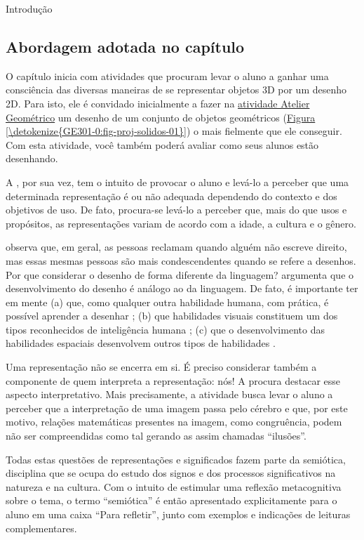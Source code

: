 \begin{apresentacao}{Introdução}
\subsection{Abordagem adotada no capítulo}

O capítulo inicia com atividades que procuram levar o aluno a ganhar uma consciência das diversas maneiras de se representar objetos 3D por um desenho 2D. Para isto, ele é convidado inicialmente a fazer na \hyperref[\detokenize{GE301-0:ativ-proj-atelier-geometrico}]{atividade Atelier Geométrico} um desenho de um conjunto de objetos geométricos (\hyperref[\detokenize{GE301-0:fig-proj-solidos-01}]{Figura \ref{\detokenize{GE301-0:fig-proj-solidos-01}}}) o mais fielmente que ele conseguir. Com esta atividade, você também poderá avaliar como seus alunos estão desenhando.

A , por sua vez, tem o intuito de provocar o aluno e levá-lo a perceber que uma determinada representação é ou não adequada dependendo do contexto e dos objetivos de uso. De fato, procura-se levá-lo a perceber que, mais do que usos e propósitos, as representações variam de acordo com a idade, a cultura e o gênero.

\citet{Cohn-2012} observa que, em geral, as pessoas reclamam quando alguém não escreve direito, mas essas mesmas pessoas são mais condescendentes quando se refere a desenhos. Por que considerar o desenho de forma diferente da linguagem? \citeauthor{Cohn-2012} argumenta que o desenvolvimento do desenho é análogo ao da linguagem. De fato, é importante ter em mente (a) que, como qualquer outra habilidade humana, com prática, é possível aprender a desenhar \citep{Edwards-2005}; (b) que habilidades visuais constituem um dos tipos reconhecidos de inteligência humana \citep{Gray-et-al-2004,Garner-2011}; (c) que o desenvolvimento das habilidades espaciais desenvolvem outros tipos de habilidades \citep{Van-Meter-et-al-2005,Fan-2015,Sinclair-et-al-2016,Khine-2017}.

Uma representação não se encerra em si. É preciso considerar também a componente de quem interpreta a representação: nós! A  procura destacar esse aspecto interpretativo. Mais precisamente, a atividade busca levar o aluno a perceber que a interpretação de uma imagem passa pelo cérebro e que, por este motivo, relações matemáticas presentes na imagem, como congruência, podem não ser compreendidas como tal gerando as assim chamadas “ilusões”.

Todas estas questões de representações e significados fazem parte da semiótica, disciplina que se ocupa do estudo dos signos e dos processos significativos na natureza e na cultura. Com o intuito de estimular uma reflexão metacognitiva sobre o tema, o termo “semiótica” é então apresentado explicitamente para o aluno em uma caixa “Para refletir”, junto com exemplos e indicações de leituras complementares.


\end{apresentacao}
